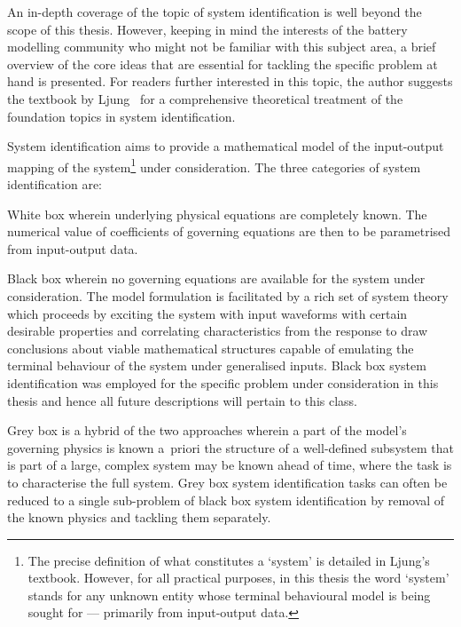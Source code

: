 

An in-depth  coverage of the topic  of system identification is  well beyond the
scope of  this thesis.  However, keeping  in mind the  interests of  the battery
modelling community  who might not be  familiar with this subject  area, a brief
overview of the core ideas that  are essential for tackling the specific problem
at hand is  presented. For readers further interested in  this topic, the author
suggests the textbook by  Ljung~\cite{Ljung1999} for a comprehensive theoretical
treatment of the foundation topics in system identification.

System identification aims  to provide a mathematical model  of the input-output
mapping  of the  system\footnote{The precise  definition of  what constitutes  a
`system' is detailed  in Ljung's textbook. However, for  all practical purposes,
in this  thesis the word `system'  stands for any unknown  entity whose terminal
behavioural model  is being  sought for ---  primarily from  input-output data.}
under consideration. The three categories of system identification are:


\begin{enumdescriptnum}[leftmargin=!,itemsep=1ex,labelwidth=\widthof{$\symbf{\text{brugg}_j}\ \scriptstyle (\times 3)$abc}
    ,partopsep=0pt
    ,topsep=0pt
    ]

\item[White  box] wherein  underlying physical  equations are  completely known.
The  numerical value  of  coefficients of  governing equations  are  then to  be
parametrised from input-output data.

\item[Black box]  wherein no  governing equations are  available for  the system
under  consideration. The  model formulation  is facilitated  by a  rich set  of
system theory  which proceeds by exciting  the system with input  waveforms with
certain desirable  properties and correlating characteristics  from the response
to draw  conclusions about viable  mathematical structures capable  of emulating
the terminal behaviour of the system  under generalised inputs. Black box system
identification was employed for the specific problem under consideration in this
thesis and hence all future descriptions will pertain to this class.

\item[Grey box] is a hybrid of the  two approaches wherein a part of the model's
governing  physics is  known  a~priori  \eg{} the  structure  of a  well-defined
subsystem  that is  part  of a  large,  complex  system may  be  known ahead  of
time,  where the  task  is  to characterise  the  full  system. Grey box  system
identification tasks can  often be reduced to a single  sub-problem of black box
system  identification  by  removal  of  the known  physics  and  tackling  them
separately.

\end{enumdescriptnum}


